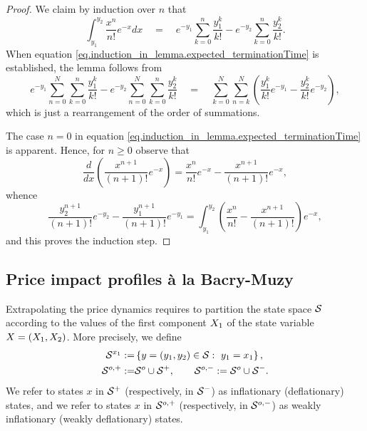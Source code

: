 \documentclass[10pt, article,table]{article}
\begin{document}
\begin{proof}
 We claim by induction over $n$ that 
 \begin{equation}\label{eq.induction_in_lemma.expected_terminationTime}
   \int_{y_1}^{y_2}
   \frac{x^{n}}{n!}e^{-x}dx
   \quad
  =
   \quad 
  e^{-y_1} \sum_{k=0}^{n} \frac{y_{1}^{k}}{k!}  -  e^{-y_2}\sum_{k=0}^{n}\frac{y_{2}^{k}}{k!}.
 \end{equation}
When equation \eqref{eq.induction_in_lemma.expected_terminationTime} is established, the lemma follows from 
\begin{equation*}
  e^{-y_1} \sum_{n=0}^{N}\sum_{k=0}^{n} \frac{y_{1}^{k}}{k!}  -  e^{-y_2}\sum_{n=0}^{N}\sum_{k=0}^{n}\frac{y_{2}^{k}}{k!}
 \quad  = \quad 
 \sum_{k=0}^{N}\sum_{n=k}^{N} \left(\frac{y_{1}^{k}}{k!}e^{-y_1}  -  \frac{y_{2}^{k}}{k!}e^{-y_2}\right),
\end{equation*}
which is just a rearrangement of the order of summations.

The case $n=0$ in equation \eqref{eq.induction_in_lemma.expected_terminationTime} is apparent. Hence, for $n\geq0$ observe that
\begin{equation*}
 \frac{d}{dx} \left( \frac{x^{n+1}}{(n+1)!}e^{-x} \right)
 = 
 \frac{x^{n}}{n!}e^{-x}  -  \frac{x^{n+1}}{(n+1)!}e^{-x},
\end{equation*}
whence
\begin{equation*}
 \frac{y_{2}^{n+1}}{(n+1)!}e^{-y_{2}}  -  \frac{y_{1}^{n+1}}{(n+1)!}e^{-y_{1}}
 =
 \int_{y_{1}}^{y_{2}}
 \left(\frac{x^{n}}{n!}  -  \frac{x^{n+1}}{(n+1)!}\right)e^{-x},
\end{equation*}
and this proves the induction step.
\end{proof}






\subsection{Price impact profiles \`a la Bacry-Muzy}\label{sec.impact_a_la_BM}
Extrapolating the price dynamics requires to partition the state space $\mathcal{S}$ according to the values of the first component $X_1$ of the state variable $X= (X_1, X_2)$. More precisely, we define
\begin{equation}\label{eq.partition_of_state_space}
\begin{split}
 \mathcal{S}^{x_1} := & \left\lbrace y=(y_1,y_2) \in \mathcal{S}: \, \, y_1 = x_1\right\rbrace,
 \\
 \mathcal{S}^{o,+} := & \mathcal{S}^{o} \cup \mathcal{S}^{+},
 \qquad
 \mathcal{S}^{o,-} := \mathcal{S}^{o} \cup \mathcal{S}^{-}.
\end{split}
\end{equation}
We refer to states $x$ in $\mathcal{S}^{+}$ (respectively, in $\mathcal{S}^{-}$) as inflationary (deflationary) states, and we refer to states $x$ in $\mathcal{S}^{o,+}$ (respectively, in $\mathcal{S}^{o,-}$) as weakly inflationary (weakly deflationary) states.
\end{document}
